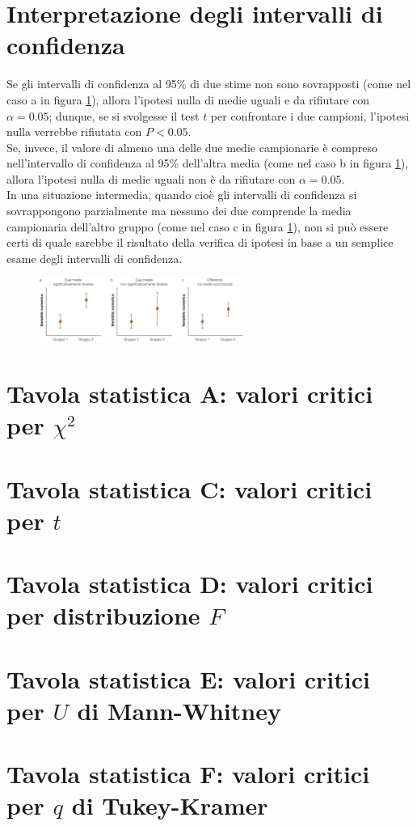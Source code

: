 \documentclass[10pt, draft]{book}
\begin{document}
\section{Interpretazione degli intervalli di confidenza}

Se gli intervalli di confidenza al 95\% di due stime non sono sovrapposti (come nel caso a in figura \ref{fig12.6-1}), allora l'ipotesi nulla di medie uguali e da rifiutare con $\alpha = 0.05$; dunque, se si svolgesse il test $t$ per confrontare i due campioni, l'ipotesi nulla verrebbe rifiutata con $P < 0.05$.
\\
Se, invece, il valore di almeno una delle due medie campionarie è compreso nell'intervallo di confidenza al 95\% dell'altra media (come nel caso b in figura \ref{fig12.6-1}), allora l'ipotesi nulla di medie uguali non è da rifiutare con $\alpha = 0.05$.
\\
In una situazione intermedia, quando cioè gli intervalli di confidenza si sovrappongono parzialmente ma nessuno dei due comprende la media campionaria dell'altro gruppo (come nel caso c in figura \ref{fig12.6-1}), non si può essere certi di quale sarebbe il risultato della verifica di ipotesi in base a un semplice esame degli intervalli di confidenza.
\begin{figure}[H]\label{fig12.6-1}
    \centering
    \includegraphics[width=0.6\textwidth]{fig12.6-1}
    \caption{\small{}}
\end{figure}


\section{Tavola statistica A: valori critici per \texorpdfstring{$\chi^2$}{Lg}} \label{tavA}

\section{Tavola statistica C: valori critici per \texorpdfstring{$t$}{Lg}} \label{tavB}

\section{Tavola statistica D: valori critici per distribuzione \texorpdfstring{$F$}{Lg}} \label{tavD}

\section{Tavola statistica E: valori critici per \texorpdfstring{$U$}{Lg} di Mann-Whitney} \label{tavE}

\section{Tavola statistica F: valori critici per \texorpdfstring{$q$}{Lg} di Tukey-Kramer} \label{tavF}
\end{document}
